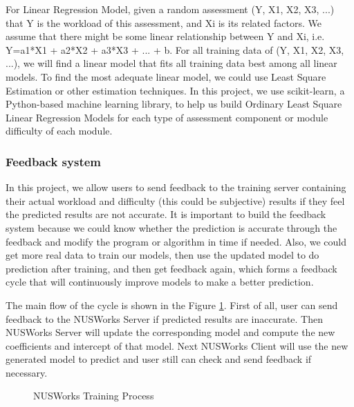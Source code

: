 \documentclass[fyp]{socreport}
\begin{document}
For Linear Regression Model, given a random assessment (Y, X1, X2, X3, ...) that Y is the workload of this assessment, and Xi is its related factors. We assume that there might be some linear relationship between Y and Xi, i.e. Y=a1*X1 + a2*X2 + a3*X3 + ... + b. For all training data of (Y, X1, X2, X3, ...), we will find a linear model that fits all training data best among all linear models. To find the most adequate linear model, we could use Least Square Estimation or other estimation techniques. In this project, we use scikit-learn, a Python-based machine learning library, to help us build Ordinary Least Square Linear Regression Models for each type of assessment component or module difficulty of each module.

\subsubsection{Feedback system}
In this project, we allow users to send feedback to the training server containing their actual workload and difficulty (this could be subjective) results if they feel the predicted results are not accurate. It is important to build the feedback system because we could know whether the prediction is accurate through the feedback and modify the program or algorithm in time if needed. Also, we could get more real data to train our models, then use the updated model to do prediction after training, and then get feedback again, which forms a feedback cycle that will continuously improve models to make a better prediction.

The main flow of the cycle is shown in the Figure {\ref{training-process}}. First of all, user can send feedback to the NUSWorks Server if predicted results are inaccurate. Then NUSWorks Server will update the corresponding model and compute the new coefficients and intercept of that model. Next NUSWorks Client will use the new generated model to predict and user still can check and send feedback if necessary.

\begin{figure}
\caption{NUSWorks Training Process}
\label{training-process}
\end{figure}
\end{document}
